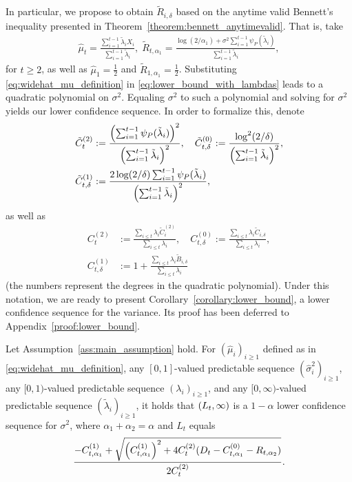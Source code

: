 In particular, we propose to obtain $ \tilde R_{i, \delta}$ based on the anytime valid Bennett's inequality presented in Theorem~\ref{theorem:bennett_anytimevalid}. That is, take 
\begin{align} \label{eq:widehat_mu_definition}
    \widehat\mu_t = \frac{\sum_{i=1}^{t-1} \tilde \lambda_i X_i}{\sum_{i=1}^{t-1} \tilde \lambda_i}, \; \tilde R_{t, \alpha_1} = \frac{\log(2/\alpha_1) + \sigma^2\sum_{i=1}^{t-1} \psi_P(\tilde \lambda_i)}{\sum_{i=1}^{t-1} \tilde \lambda_i}, 
\end{align}
for $t \geq 2$, as well as $\widehat\mu_1 = \frac{1}{2}$ and $\tilde R_{1, \alpha_1} = \frac{1}{2}$. Substituting \eqref{eq:widehat_mu_definition} in \eqref{eq:lower_bound_with_lambdas} leads to a quadratic polynomial on $\sigma^2$. Equaling $\sigma^2$ to such a polynomial and solving for $\sigma^2$ yields our lower confidence sequence. In order to formalize this, denote
\begin{align*}
    \tilde C^{(2)}_{t} &:= \frac{\left( \sum_{i=1}^{t-1} \psi_P(\tilde \lambda_i)\right)^2}{\left( \sum_{i=1}^{t-1} \tilde \lambda_i \right)^2}, 
    \quad \tilde C^{(0)}_{t, \delta}:= \frac{\log^2(2/\delta) }{\left( \sum_{i=1}^{t-1} \tilde \lambda_i \right)^2},
    \\ \tilde C^{(1)}_{t, \delta} &:= \frac{2\log(2/\delta)\sum_{i=1}^{t-1} \psi_P(\tilde \lambda_i)}{\left( \sum_{i=1}^{t-1} \tilde \lambda_i \right)^2}, 
\end{align*}
 as well as
\begin{align*}
    C^{(2)}_{t} &:=  \frac{\sum_{i \leq t}\lambda_i \tilde C^{(2)}_{i}}{\sum_{i \leq t} \lambda_i}, 
    \quad C^{(0)}_{t, \delta} := \frac{\sum_{i \leq t}\lambda_i \tilde C_{i, \delta}}{\sum_{i \leq t} \lambda_i},
    \\ C^{(1)}_{t, \delta} &:= 1 +  \frac{\sum_{i \leq t}\lambda_i \tilde B_{i, \delta}}{\sum_{i \leq t} \lambda_i}
\end{align*}
(the numbers represent the degrees in the quadratic polynomial). Under this notation, we are ready to present Corollary~\ref{corollary:lower_bound}, a lower confidence sequence for the variance. Its proof has been deferred to Appendix~\ref{proof:lower_bound}.
\begin{corollary}  \label{corollary:lower_bound}
    Let Assumption~\ref{ass:main_assumption} hold. For $(\widehat\mu_i)_{i\geq1}$ defined as in \eqref{eq:widehat_mu_definition}, any $[0, 1]$-valued predictable sequence $(\widehat\sigma_i^2)_{i \geq 1}$, any $[0, 1)$-valued predictable sequence $(\lambda_i)_{i \geq 1}$, and any $[0, \infty)$-valued predictable sequence $(\tilde\lambda_i)_{i \geq 1}$, it holds that $\left( L_t, \infty\right)$ is a $1-\alpha$ lower confidence sequence for $\sigma^2$, 
    where $\alpha_1 + \alpha_2 = \alpha$ and $L_t$ equals
    \begin{align} \label{eq:lower_bound_process}
        \frac{-C^{(1)}_{t, \alpha_1} + \sqrt{\left( C^{(1)}_{t, \alpha_1}\right)^2 + 4C^{(2)}_t(D_t - C^{(0)}_{t, \alpha_1} - R_{t, \alpha_2})}}{2C^{(2)}_t}.
    \end{align}
\end{corollary}

